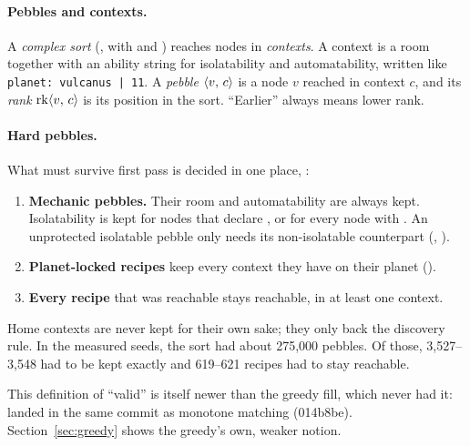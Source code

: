 \paragraph{Pebbles and contexts.} A \emph{complex sort} (, with  and ) reaches nodes in \emph{contexts}. A context is a room together with an ability string for isolatability and automatability, written like \texttt{planet:\,vulcanus\,|\,11}. A \emph{pebble} $\langle v,\,c\rangle$ is a node $v$ reached in context $c$, and its \emph{rank} $\operatorname{rk}\langle v,\,c\rangle$ is its position in the sort. ``Earlier'' always means lower rank.

\paragraph{Hard pebbles.} What must survive first pass is decided in one place, :
\begin{enumerate}
  \item \textbf{Mechanic pebbles.} Their room and automatability are always kept. Isolatability is kept for nodes that declare , or for every node with . An unprotected isolatable pebble only needs its non-isolatable counterpart (, ).
  \item \textbf{Planet-locked recipes} keep every context they have on their planet ().
  \item \textbf{Every recipe} that was reachable stays reachable, in at least one context.
\end{enumerate}
Home contexts are never kept for their own sake; they only back the discovery rule. In the measured seeds, the sort had about 275{,}000 pebbles. Of those, 3{,}527--3{,}548 had to be kept exactly and 619--621 recipes had to stay reachable.

\medskip
This definition of ``valid'' is itself newer than the greedy fill, which never had it:  landed in the same commit as monotone matching (014b8be). Section~\ref{sec:greedy} shows the greedy's own, weaker notion.
